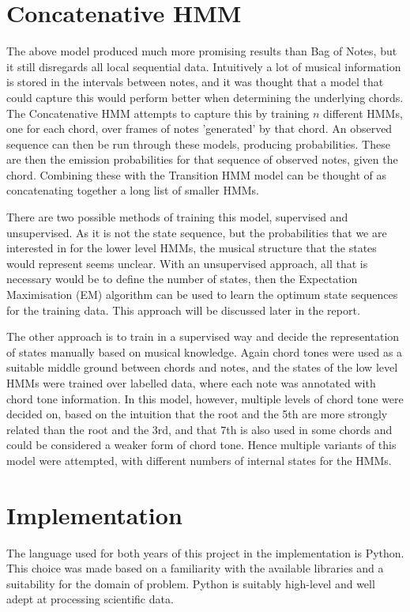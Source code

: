 \documentclass[bsc,singlespacing,parskip, deptreport]{infthesis}
\begin{document}
\section{Concatenative HMM}

The above model produced much more promising results than Bag of Notes, but it still disregards all local sequential data. Intuitively a lot of musical information is stored in the intervals between notes, and it was thought that a model that could capture this would perform better when determining the underlying chords. The Concatenative HMM attempts to capture this by training $n$ different HMMs, one for each chord, over frames of notes 'generated' by that chord. An observed sequence can then be run through these models, producing probabilities. These are then the emission probabilities for that sequence of observed notes, given the chord. Combining these with the Transition HMM model can be thought of as concatenating together a long list of smaller HMMs. 

There are two possible methods of training this model, supervised and unsupervised. As it is not the state sequence, but the probabilities that we are interested in for the lower level HMMs, the musical structure that the states would represent seems unclear. With an unsupervised approach, all that is necessary would be to define the number of states, then the Expectation Maximisation (EM) algorithm can be used to learn the optimum state sequences for the training data. This approach will be discussed later in the report.

The other approach is to train in a supervised way and decide the representation of states manually based on musical knowledge. Again chord tones were used as a suitable middle ground between chords and notes, and the states of the low level HMMs were trained over labelled data, where each  note was annotated with chord tone information. In this model, however, multiple levels of chord tone were decided on, based on the intuition that the root and the 5th are more strongly related than the root and the 3rd, and that 7th is also used in some chords and could be considered a weaker form of chord tone. Hence multiple variants of this model were attempted, with different numbers of internal states for the HMMs.

\section{Implementation}

The language used for both years of this project in the implementation is Python. This choice was made based on a familiarity with the available libraries and a suitability for the domain of problem. Python is suitably high-level and well adept at processing scientific data.
\end{document}
